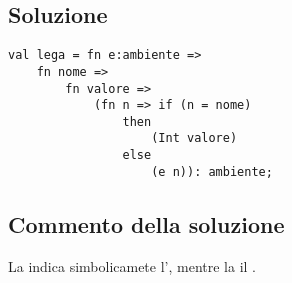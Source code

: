 \subsection{Soluzione}

\begin{lstlisting}[style = SML, caption = {Definizione della funzione \sml{lega}}]
val lega = fn e:ambiente =>
	fn nome =>
		fn valore =>
			(fn n => if (n = nome)
			    then
					(Int valore)
			    else
					(e n)): ambiente;
\end{lstlisting}

\subsection{Commento della soluzione}

La  indica simbolicamete l', mentre la  il .
